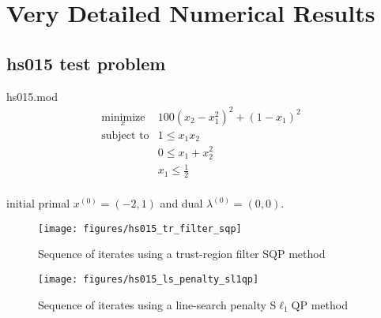 \section{Very Detailed Numerical Results}\label{S:numerics}

%
%

%
%

\subsection{hs015 test problem}

hs015.mod
\begin{equation*}
\begin{array}{lll}
\underset{x}{\text{minimize}} 	& 100(x_2 - x_1^2)^2 + (1 - x_1)^2 	& \\
\text{subject to} 				& 1 \le x_1 x_2 					& \\
								& 0 \le x_1 + x_2^2 				& \\
								& x_1 \le \frac{1}{2} 				& \\
\end{array}
\end{equation*}

initial primal $x^{(0)} = (-2, 1)$ and dual $\lambda^{(0)} = (0, 0)$.

\begin{figure}[h!]
	\centering
	\texttt{[image: figures/hs015\_tr\_filter\_sqp]}
	\caption{Sequence of iterates using a trust-region filter SQP method}
\end{figure}

\begin{figure}[h!]
	\centering
	\texttt{[image: figures/hs015\_ls\_penalty\_sl1qp]}
	\caption{Sequence of iterates using a line-search penalty S$\ell_1$QP method}
\end{figure}

